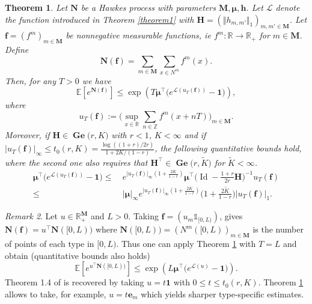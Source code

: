 \documentclass[reqno,final,11pt]{amsart}
\renewcommand{\cite}{\citet}
\theoremstyle{plain}
\newtheorem{theorem}{Theorem}[section]
\theoremstyle{definition}
\theoremstyle{remark}
\newtheorem{remark}[theorem]{Remark}
\newcommand{\R}{\mathds{R}}
\newcommand{\ind}{\mathds{1}}
\newcommand{\E}[1]{\mathds{E}\left[#1\right]}
\newcommand{\M}{\bm{M}}
\newcommand{\Ge}[2]{\bm{\Gel(} #1,#2 \bm{)} }
\newcommand{\Z}{\mathds{Z}}
\renewcommand{\L}{\bm{\mathscr{L}}}
\newcommand{\ones}{\bm{1}}
\newcommand{\e}{\bm{e}}
\newcommand{\h}{\bm{h}}
\renewcommand{\H}{\bm{H}}
\newcommand{\pos}{\R_+^{\M}}
\newcommand{\trp}{^{\intercal}}
\DeclareMathOperator{\Gel}{Ge}
\DeclareMathOperator{\Id}{Id}
\begin{document}
\begin{theorem}\label{theorem2}
	Let $\bm{N}$ be a Hawkes process with parameters $\M,\bm{\mu},\h$. Let $\L$ denote the function introduced in Theorem \ref{theorem1} with $\H = (\Vert h_{m,m'} \Vert_1)_{m,m'\in\M}$. Let $\bm{f} = (f^m)_{m\in\M}$ be nonnegative measurable functions, ie $f^m : \R \rightarrow \R_+$ for $m\in\M$. Define 
	\[ \bm{N}(\bm{f}) = \sum_{m\in\M} \sum_{x\in N^m} f^m(x).\]
	Then, for any $T>0$ we have
	\begin{equation}
		\E{e^{\bm{N}(\bm{f})}} \leq \exp\left( T \bm{\mu}\trp \big(e^{\L(u_T(\bm{f}))}-\ones\big) \right),
	\end{equation}
	where
	\[ u_T(\bm{f}) := \Big(\sup_{x\in\R} \sum_{n\in\Z} f^m(x+nT)\Big)_{m\in\M}.\]
	Moreover, if $\H \in \Ge{r}{K}$ with $r<1$, $K<\infty$ and if $\vert u_T(\bm{f}) \vert_{\infty} \leq t_0(r,K) = \frac{\log((1+r)/2r)}{1+2K/(1-r)}$, the following quantitative bounds hold, where the second one also requires that $\H\trp \in \Ge{r}{\tilde{K}}$ for $\tilde{K}<\infty$.
	\begin{align}
		\bm{\mu}\trp \big(e^{\L(u_T(\bm{f}))}-\ones\big) \leq \ &  e^{\vert u_T(\bm{f}) \vert_{\infty}(1+\frac{2K}{1-r})} \bm{\mu}\trp \big(\Id-\frac{1+r}{2r}\H\big)^{-1}u_T(\bm{f})\label{quant2}\\
		\leq \ &  \vert \bm{\mu}\vert_{\infty} e^{\vert u_T(\bm{f}) \vert_{\infty} (1+\frac{2K}{1-r})}  \big(1+\frac{2\tilde{K}}{1-r}\big) \vert u_T(\bm{f}) \vert_1.\label{quant3}
	\end{align}
\end{theorem}

\begin{remark}
	Let $u\in \pos$ and $L>0$. Taking $\bm{f} = (u_m \ind_{[0,L)})$, gives $\bm{N}(\bm{f}) = u\trp \bm{N}([0,L))$ where $\bm{N}([0,L)) = (N^m([0,L))_{m\in\M}$ is the number of points of each type in $[0,L)$. Thus one can apply Theorem \ref{theorem2} with $T=L$ and obtain (quantitative bounds also holds) 
	\begin{equation*}
		\E{e^{u\trp \bm{N}([0,L))}} \leq  \exp\left( L \bm{\mu} \trp \big( e^{\L(u)} -\ones \big)\right).
	\end{equation*}
    Theorem 1.4 of \cite{leblanc_exponential_2024} is recovered by taking $u=t\ones$ with $0\leq t \leq t_0(r,K)$. Theorem \ref{theorem2} allows to take, for example, $u = t\e_m$ which yields sharper type-specific estimates.
\end{remark}
\end{document}
